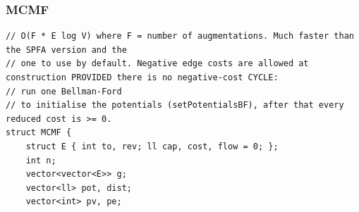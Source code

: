 \documentclass[9pt,a4paper,twocolumn]{extarticle}
\begin{document}
\filbreak
\subsubsection{MCMF}
\nopagebreak
\begin{lstlisting}
// O(F * E log V) where F = number of augmentations. Much faster than the SPFA version and the
// one to use by default. Negative edge costs are allowed at construction PROVIDED there is no negative-cost CYCLE:
// run one Bellman-Ford
// to initialise the potentials (setPotentialsBF), after that every reduced cost is >= 0.
struct MCMF {
    struct E { int to, rev; ll cap, cost, flow = 0; };
    int n;
    vector<vector<E>> g;
    vector<ll> pot, dist;
    vector<int> pv, pe;


\end{lstlisting}
\end{document}
